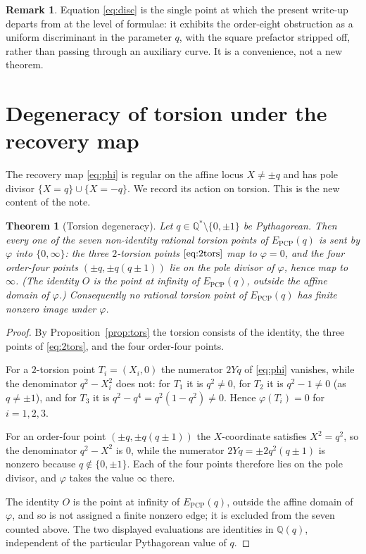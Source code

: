 \documentclass[11pt,reqno]{amsart}
\theoremstyle{plain}
\newtheorem{theorem}{Theorem}
\theoremstyle{definition}
\newtheorem{remark}{Remark}
\newcommand{\Q}{\mathbb{Q}}
\newcommand{\Epcp}{E_{\mathrm{PCP}}}
\begin{document}
\begin{remark}
Equation \eqref{eq:disc} is the single point at which the present write-up departs from
\cite{Yoshida} at the level of formulae: it exhibits the order-eight obstruction as a
uniform discriminant in the parameter $q$, with the square prefactor stripped off,
rather than passing through an auxiliary curve. It is a convenience, not a new theorem.
\end{remark}

\section{Degeneracy of torsion under the recovery map}

The recovery map \eqref{eq:phi} is regular on the affine locus $X\neq\pm q$ and has pole
divisor $\{X=q\}\cup\{X=-q\}$. We record its action on torsion. This is the new content
of the note.

\begin{theorem}[Torsion degeneracy]\label{thm:main}
Let $q\in\Q^{\ast}\setminus\{0,\pm1\}$ be Pythagorean. Then every one of the seven
non-identity rational torsion points of $\Epcp(q)$ is sent by $\varphi$ into
$\{0,\infty\}$: the three $2$-torsion points $\eqref{eq:2tors}$ map to $\varphi=0$, and
the four order-four points $(\pm q,\pm q(q\pm1))$ lie on the pole divisor of $\varphi$,
hence map to $\infty$. (The identity $O$ is the point at infinity of $\Epcp(q)$, outside
the affine domain of $\varphi$.) Consequently no rational torsion point of $\Epcp(q)$ has
finite nonzero image under $\varphi$.
\end{theorem}

\begin{proof}
By Proposition~\ref{prop:tors} the torsion consists of the identity, the three points of
\eqref{eq:2tors}, and the four order-four points.

For a $2$-torsion point $T_{i}=(X_{i},0)$ the numerator $2Yq$ of \eqref{eq:phi} vanishes,
while the denominator $q^{2}-X_{i}^{2}$ does not: for $T_{1}$ it is $q^{2}\neq0$, for
$T_{2}$ it is $q^{2}-1\neq0$ (as $q\neq\pm1$), and for $T_{3}$ it is
$q^{2}-q^{4}=q^{2}(1-q^{2})\neq0$. Hence $\varphi(T_{i})=0$ for $i=1,2,3$.

For an order-four point $(\pm q,\pm q(q\pm1))$ the $X$-coordinate satisfies $X^{2}=q^{2}$,
so the denominator $q^{2}-X^{2}$ is $0$, while the numerator $2Yq=\pm2q^{2}(q\pm1)$ is
nonzero because $q\notin\{0,\pm1\}$. Each of the four points therefore lies on the pole
divisor, and $\varphi$ takes the value $\infty$ there.

The identity $O$ is the point at infinity of $\Epcp(q)$, outside the affine domain of
$\varphi$, and so is not assigned a finite nonzero edge; it is excluded from the seven
counted above. The two displayed evaluations are identities in $\Q(q)$, independent of
the particular Pythagorean value of $q$.
\end{proof}
\end{document}
